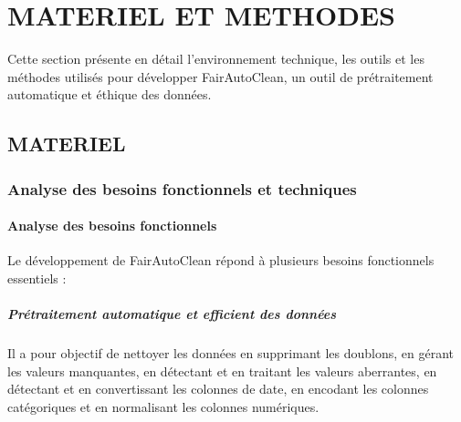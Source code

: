 \chapter{MATERIEL ET METHODES}

Cette section présente en détail l'environnement technique, les outils et les méthodes utilisés pour développer FairAutoClean, un outil de prétraitement automatique et éthique des données.

\section{MATERIEL}

\subsection{Analyse des besoins fonctionnels et techniques}

\subsubsection{Analyse des besoins fonctionnels}

Le développement de FairAutoClean répond à plusieurs besoins fonctionnels essentiels :

\paragraph{Prétraitement automatique et efficient des données}
Il a pour objectif de nettoyer les données en supprimant les doublons, en gérant les valeurs manquantes, en détectant et en traitant les valeurs aberrantes, en détectant et en convertissant les colonnes de date, en encodant les colonnes catégoriques et en normalisant les colonnes numériques.

